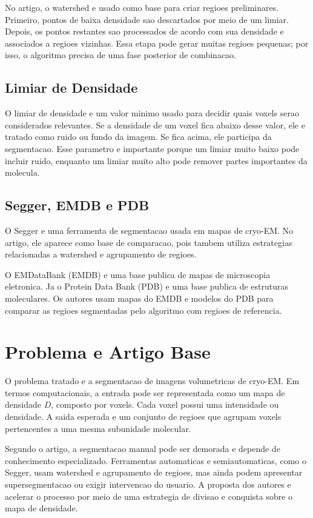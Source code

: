 \documentclass[tcc1]{uftex}
\begin{document}
No artigo, o watershed e usado como base para criar regioes preliminares. Primeiro, pontos de baixa densidade sao descartados por meio de um limiar. Depois, os pontos restantes sao processados de acordo com sua densidade e associados a regioes vizinhas. Essa etapa pode gerar muitas regioes pequenas; por isso, o algoritmo precisa de uma fase posterior de combinacao.

\section{Limiar de Densidade}

O limiar de densidade e um valor minimo usado para decidir quais voxels serao considerados relevantes. Se a densidade de um voxel fica abaixo desse valor, ele e tratado como ruido ou fundo da imagem. Se fica acima, ele participa da segmentacao. Esse parametro e importante porque um limiar muito baixo pode incluir ruido, enquanto um limiar muito alto pode remover partes importantes da molecula.

\section{Segger, EMDB e PDB}

O Segger e uma ferramenta de segmentacao usada em mapas de cryo-EM. No artigo, ele aparece como base de comparacao, pois tambem utiliza estrategias relacionadas a watershed e agrupamento de regioes.

O EMDataBank (EMDB) e uma base publica de mapas de microscopia eletronica. Ja o Protein Data Bank (PDB) e uma base publica de estruturas moleculares. Os autores usam mapas do EMDB e modelos do PDB para comparar as regioes segmentadas pelo algoritmo com regioes de referencia.

\chapter{Problema e Artigo Base}

O problema tratado e a segmentacao de imagens volumetricas de cryo-EM. Em termos computacionais, a entrada pode ser representada como um mapa de densidade $D$, composto por voxels. Cada voxel possui uma intensidade ou densidade. A saida esperada e um conjunto de regioes que agrupam voxels pertencentes a uma mesma subunidade molecular.

Segundo o artigo, a segmentacao manual pode ser demorada e depende de conhecimento especializado. Ferramentas automaticas e semiautomaticas, como o Segger, usam watershed e agrupamento de regioes, mas ainda podem apresentar supersegmentacao ou exigir intervencao do usuario. A proposta dos autores e acelerar o processo por meio de uma estrategia de divisao e conquista sobre o mapa de densidade.
\end{document}
